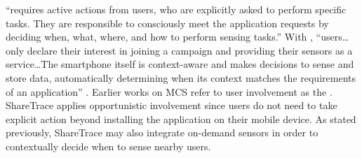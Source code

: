  ``requires active actions from users, who are explicitly asked to perform specific tasks. They are responsible to consciously meet the application requests by deciding when, what, where, and how to perform sensing tasks.'' With , ``users{\ldots}only declare their interest in joining a campaign and providing their sensors as a service{\ldots}The smartphone itself is context-aware and makes decisions to sense and store data, automatically determining when its context matches the requirements of an application'' \citep{Capponi2019}. Earlier works on MCS refer to user involvement as the  \citep{Lane2010, Ganti2011, Ma2014}. ShareTrace applies opportunistic involvement since users do not need to take explicit action beyond installing the application on their mobile device. As stated previously, ShareTrace may also integrate on-demand sensors in order to contextually decide when to sense nearby users.

